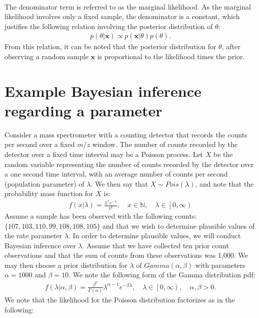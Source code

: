 \begin{DoubleSpace*}
\begin{gather}
\end{gather}
The denominator term is referred to as the marginal likelihood. As the marginal likelihood involves only a fixed sample, the denominator is a constant, which justifies the following relation involving the posterior distribution of $\theta$:
\begin{gather}
	p(\theta|\textbf{x}) \propto p(\textbf{x}|\theta)p(\theta). 
\end{gather}
From this relation, it can be noted that the posterior distribution for $\theta$, after observing a random sample $\textbf{x}$ is proportional to the likelihood times the prior.

\section{Example Bayesian inference regarding a parameter}
Consider a mass spectrometer with a counting detector that records the counts per second over a fixed $m/z$ window. The number of counts recorded by the detector over a fixed time interval may be a Poisson process. Let $X$ be the random variable representing the number of counts recorded by the detector over a one second time interval, with an average number of counts per second (population parameter) of $\lambda$. We then say that $X\sim Pois(\lambda)$, and note that the probability mass function for $X$ is:
\begin{gather}
	f(x|\lambda)=\frac{\lambda^x e^{-\lambda}}{x!}, \quad x \in \mathbb{N}, \quad \lambda \in \left[0, \infty \right)
\end{gather}
 Assume a sample has been observed with the following counts: $\{107, 103, 110, 99, 108, 108, 105\}$ and that we wish to determine plausible values of the rate parameter $\lambda$. In order to determine plausible values, we will conduct Bayesian inference over $\lambda$. Assume that we have collected ten prior count observations and that the sum of counts from these observations was 1,000. We may then choose a prior distribution for $\lambda$ of $Gamma(\alpha, \beta)$ with parameters $\alpha=1000$ and $\beta=10$. We note the following form of the Gamma distribution pdf: 
\begin{gather}
	f(\lambda|\alpha,\beta) =\frac{\beta^{\alpha}}{\Gamma(\alpha)}\lambda^{\alpha-1}e^{-\beta \lambda}, \quad \lambda \in \left[0, \infty \right), \quad \alpha,\beta >0.
\end{gather}
We note that the likelihood for the Poisson distribution factorizes as in the following:
\begin{align}

\end{align}
\end{DoubleSpace*}
